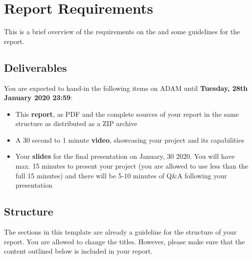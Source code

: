 \section*{Report Requirements}


This is a brief overview of the requirements on the \coursename{} and some guidelines for the report.


\subsection*{Deliverables}

You are expected to hand-in the following items on ADAM until \textbf{Tuesday, 28th January 2020 23:59}:

\begin{itemize}
    \item This \textbf{report}, as PDF and the complete sources of your report in the same structure as distributed as a ZIP archive
    \item A 30 second to 1 minute \textbf{video}, showcasing your project and its capabilities
    \item Your \textbf{slides} for the final presentation on January, 30 2020. You will have max. 15 minutes to present your project (you are allowed to use less than the full 15 minutes) and there will be 5-10 minutes of Q\&A following your presentation
\end{itemize}

\subsection*{Structure}

The sections in this template are already a guideline for the structure of your report.
You are allowed to change the titles. However, please make sure that the content outlined below is included in your report.

